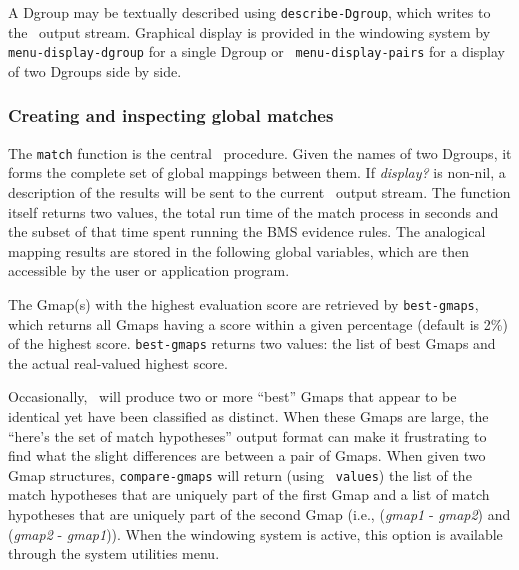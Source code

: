 A Dgroup may be textually described using {\tt describe-Dgroup}, which
writes to the \SME\ output stream. Graphical display is provided in the
windowing system by {\tt menu-display-dgroup} for a single Dgroup or {\tt
menu-display-pairs} for a display of two Dgroups side by side.


\subsubsection{Creating and inspecting global matches}\label{ss:match}

\indent
{}

The {\tt match} function is the central \SME\ procedure. Given the names of two
Dgroups, it forms the complete set of global mappings between them. If {\it display?}
is non-nil, a description of the results will be sent to the current \SME\
output stream. The function itself returns two values, the total run time of
the match process in seconds and the subset of that time spent running the
BMS evidence rules. The analogical mapping results are stored in the
following global variables, which are then accessible by the user or
application program.

\decvar{*gmaps*}\index{global mapping, *gmaps*}

\noindent
The Gmap(s) with the highest evaluation score are retrieved by
{\tt best-gmaps}, which returns all Gmaps having a score within a given
percentage (default is 2\%) of the highest score. {\tt best-gmaps} returns
two values: the list of best Gmaps and the actual real-valued highest score.


Occasionally, \SME\ will produce two or more ``best'' Gmaps that appear to
be identical yet have been classified as distinct. When these Gmaps are
large, the ``here's the set of match hypotheses'' output format can make it
frustrating to find what the slight differences are between a pair of Gmaps.
When given two Gmap structures, {\tt compare-gmaps} will return (using {\tt
values}) the list of the match hypotheses that are uniquely part of the
first Gmap and a list of match hypotheses that are uniquely part of the
second Gmap (i.e., ({\it gmap1} - {\it gmap2}) and ({\it gmap2} - {\it
gmap1})). When the windowing system is active, this option is available
through the system utilities menu.


